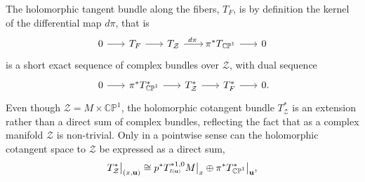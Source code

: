 \documentclass[11pt]{amsart}
\theoremstyle{remark}
\theoremstyle{remark}
\theoremstyle{definition}
\theoremstyle{definition}
\theoremstyle{definition}
\newcommand{\Iu}{\scriptscriptstyle{I\nhp(\nhp\mathbf{u}\hspace{-0.25pt})}} %
\newcommand{\0}{{\scriptstyle 0'}} %
\newcommand{\1}{{\scriptstyle 1'}}
\newcommand{\hp}{\hspace{0.5pt}} %
\newcommand{\nhp}{\hspace{-0.5pt}} %
\begin{document}
The holomorphic tangent bundle along the fibers, $T_F$, is by definition the kernel of the differential map $d\pi$, that is
\begin{equation*}
\begin{tikzcd}[column sep=scriptsize]
0 \rar & T_F \rar & T_{\mathcal{Z}} \rar["d\pi",shorten >=-0.2em] & \pi^*T_{\hp\smash{\mathbb{CP}^1}} \rar & 0
\end{tikzcd}
\end{equation*}
is a short exact sequence of complex bundles over $\mathcal{Z}$, with dual sequence
\begin{equation*}
\begin{tikzcd}[column sep=scriptsize]
0 \rar & \pi^*T^*_{\hp\smash{\mathbb{CP}^1}} \rar & T^*_{\mathcal{Z}} \rar & T^*_F \rar & 0\mathrlap{.}
\end{tikzcd}
\end{equation*}
Even though $\mathcal{Z} = M \times \mathbb{CP}^1$, the holomorphic cotangent bundle $T^*_{\mathcal{Z}}$ is an extension rather than a direct sum of complex bundles, reflecting the fact that as a complex manifold $\mathcal{Z}$ is non-trivial. Only in a pointwise sense can the holomorphic cotangent space to $\mathcal{Z}$ be expressed as a direct sum,
\begin{equation}
T^*_{\mathcal{Z}} \big|_{(x,\mathbf{u})} \cong p^* T^{*1,0}_{\Iu} M \big|_x \oplus \pi^* T^*_{\hp\smash{\mathbb{CP}^1}} \big|_{\mathbf{u}},
\end{equation}
\end{document}
